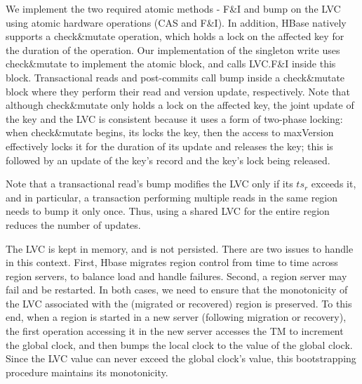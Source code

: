 We implement the two required atomic methods - F\&I and bump on the LVC using atomic hardware operations (CAS and F\&I). 
In addition, 
HBase   natively supports  a check\&mutate operation, which holds a lock on the affected key for the duration of the operation.
Our implementation of the singleton write uses  check\&mutate to implement the atomic block, and calls LVC.F\&I inside this block.
Transactional reads and post-commits call bump inside a check\&mutate  block where they perform their read and version update, respectively. 
Note that although check\&mutate only holds a lock on the affected key, the joint update of the key and the LVC is consistent
because it uses a form of two-phase locking: when check\&mutate begins, its locks the key, then the access to maxVersion effectively
locks it for the duration of its update and releases the key; this is followed by an update of the key's record and the key's lock being released.

Note that a transactional read's bump modifies the LVC only if its $ts_r$ exceeds it, and in particular, 
a transaction performing multiple reads in the same region needs to bump it only once. 
Thus, using a shared LVC for the entire region reduces the number of updates.

The LVC is kept in memory, and is not persisted. 
There are two issues to handle in this context. First,
Hbase migrates region control from time to time across region servers, to balance load and handle failures. 
Second, a region server may fail and be restarted. 
In both cases, we need to ensure that the monotonicity of the LVC associated with the (migrated or recovered) region is preserved.
To this end, when a region is started in a new server (following migration or recovery), the first operation accessing it
in the new server accesses the TM to increment the global clock, and then 
bumps the local clock to the value of the global clock.
Since the LVC value can never exceed the global clock's value, this bootstrapping procedure maintains its monotonicity.



